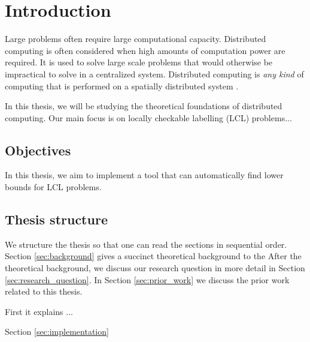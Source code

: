 
\section{Introduction}  \label{sec:introduction}

Large problems often require large computational capacity.
Distributed computing is often considered when high amounts of computation power are required.
It is used to solve large scale problems that would otherwise be impractical to solve in a centralized system.
Distributed computing is \emph{any kind} of computing that is performed on a spatially distributed system
\cite{DBLP:books/el/leeuwen90/LamportL90}.

In this thesis, we will be studying the theoretical foundations of distributed computing.
Our main focus is on locally checkable labelling (LCL) problems...



\subsection{Objectives}
In this thesis, we aim to implement a tool that can automatically find lower bounds for LCL problems.

\subsection{Thesis structure}
We structure the thesis so that one can read the sections in sequential order.
Section \ref{sec:background} gives a succinct theoretical background to the 
After the theoretical background, we discuss our research question  in more detail in Section \ref{sec:research_question}.
In Section \ref{sec:prior_work} we discuss the prior work related to this thesis.


First it explains ... %

Section \ref{sec:implementation}
